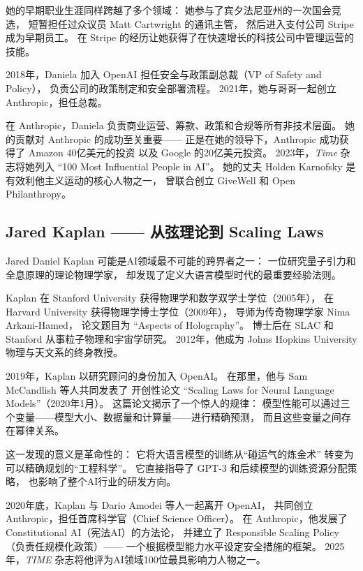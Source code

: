 她的早期职业生涯同样跨越了多个领域：
她参与了宾夕法尼亚州的一次国会竞选，
短暂担任过众议员 Matt Cartwright 的通讯主管，
然后进入支付公司 Stripe 成为早期员工。
在 Stripe 的经历让她获得了在快速增长的科技公司中管理运营的技能。

2018年，Daniela 加入 OpenAI 担任安全与政策副总裁（VP of Safety and Policy），
负责公司的政策制定和安全部署流程。
2021年，她与哥哥一起创立 Anthropic，担任总裁。

在 Anthropic，Daniela 负责商业运营、筹款、政策和合规等所有非技术层面。
她的贡献对 Anthropic 的成功至关重要——
正是在她的领导下，Anthropic 成功获得了 Amazon 40亿美元的投资
以及 Google 的20亿美元投资。
2023年，\emph{Time} 杂志将她列入 ``100 Most Influential People in AI''。
她的丈夫 Holden Karnofsky 是有效利他主义运动的核心人物之一，
曾联合创立 GiveWell 和 Open Philanthropy。


\subsection{Jared Kaplan —— 从弦理论到 Scaling Laws}
\label{subsec:jared-kaplan}

Jared Daniel Kaplan 可能是AI领域最不可能的跨界者之一：
一位研究量子引力和全息原理的理论物理学家，
却发现了定义大语言模型时代的最重要经验法则。

Kaplan 在 Stanford University 获得物理学和数学双学士学位（2005年），
在 Harvard University 获得物理学博士学位（2009年），
导师为传奇物理学家 Nima Arkani-Hamed，
论文题目为 ``Aspects of Holography''。
博士后在 SLAC 和 Stanford 从事粒子物理和宇宙学研究。
2012年，他成为 Johns Hopkins University 物理与天文系的终身教授。

2019年，Kaplan 以研究顾问的身份加入 OpenAI。
在那里，他与 Sam McCandlish 等人共同发表了
开创性论文 ``Scaling Laws for Neural Language Models''（2020年1月）。
这篇论文揭示了一个惊人的规律：
模型性能可以通过三个变量——模型大小、数据量和计算量——进行精确预测，
而且这些变量之间存在幂律关系。

这一发现的意义是革命性的：
它将大语言模型的训练从``碰运气的炼金术''
转变为可以精确规划的``工程科学''。
它直接指导了 GPT-3 和后续模型的训练资源分配策略，
也影响了整个AI行业的研发方向。

2020年底，Kaplan 与 Dario Amodei 等人一起离开 OpenAI，
共同创立 Anthropic，担任首席科学官（Chief Science Officer）。
在 Anthropic，他发展了 Constitutional AI（宪法AI）的方法论，
并建立了 Responsible Scaling Policy（负责任规模化政策）——
一个根据模型能力水平设定安全措施的框架。
2025年，\emph{TIME} 杂志将他评为AI领域100位最具影响力人物之一。


